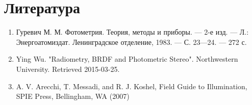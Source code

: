 \documentclass[12pt]{article}
\begin{document}
\section{Литература}
\begin{enumerate}
  \item Гуревич М. М. Фотометрия. Теория, методы и приборы. — 2-е изд. — Л.: Энергоатомиздат. Ленинградское отделение, 1983. — С. 23—24. — 272 с.
  \item Ying Wu. "Radiometry, BRDF and Photometric Stereo". Northwestern University. Retrieved 2015-03-25.
  \item A. V. Arecchi, T. Messadi, and R. J. Koshel, Field Guide to Illumination, SPIE Press, Bellingham, WA (2007)
\end{enumerate}
\end{document}
